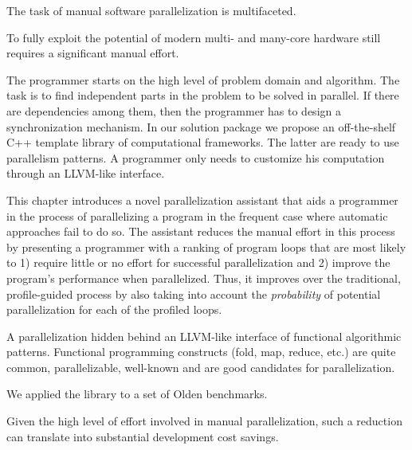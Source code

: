 
\quad The task of manual software parallelization is multifaceted. 

To fully exploit the potential of modern multi- and many-core hardware still requires a significant manual effort.


\quad The programmer starts on the high level of problem domain and algorithm. The task is to find independent parts in the problem to be solved in parallel. If there are dependencies among them, then the programmer has to design a synchronization mechanism. In our solution package we propose an off-the-shelf C++ template library of computational frameworks. The latter are ready to use parallelism patterns. A programmer only needs to customize his computation through an LLVM-like interface.

This chapter introduces a novel parallelization assistant that aids a programmer in the process of parallelizing a program in the frequent case where automatic approaches fail to do so.
%
The assistant reduces the manual effort in this process by presenting a programmer with a ranking of program loops that are most likely to 1) require little or no effort for successful parallelization and 2) improve the program's performance when parallelized.
%
Thus, it improves over the traditional, profile-guided process by also taking into account the \emph{probability} of potential parallelization for each of the profiled loops.


A parallelization hidden behind an LLVM-like interface of functional algorithmic patterns. 
%
Functional programming constructs (fold, map, reduce, etc.) are quite common, parallelizable, well-known and are good candidates for parallelization.

We applied the library to a set of Olden benchmarks.

%
Given the high level of effort involved in manual parallelization, such a reduction can translate into substantial development cost savings.


